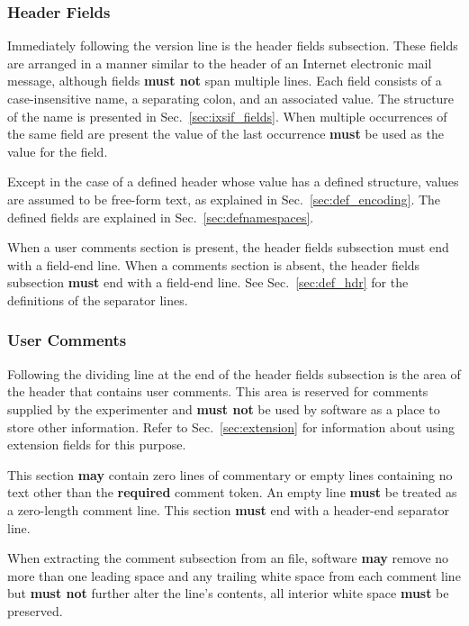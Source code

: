 \documentclass{article}
\begin{document}
\subsubsection{Header Fields}
\label{sec:def_hdr_fields}

Immediately following the version line is the header fields
subsection.  These fields are arranged in a manner similar to the
header of an Internet electronic mail message, although {\xdi} fields
\textbf{must not} span multiple lines.  Each field consists of a
case-insensitive name, a separating colon, and an associated value.
The structure of the name is presented in Sec.~\ref{sec:ixsif_fields}.
When multiple occurrences of the same field are present the value of
the last occurrence \textbf{must} be used as the value for the field.

Except in the case of a defined header whose value has a defined
structure, values are assumed to be free-form text, as explained in
Sec.~\ref{sec:def_encoding}.  The defined fields are explained in
Sec.~\ref{sec:defnamespaces}.

When a user comments section is present, the header fields subsection
must end with a field-end line.  When a comments section is absent,
the header fields subsection \textbf{must} end with a field-end line.  See
Sec.~\ref{sec:def_hdr} for the definitions of the separator lines.

\subsubsection{User Comments}
\label{sec:def_hdr_comments}

Following the dividing line at the end of the header fields subsection
is the area of the header that contains user comments.  This area is
reserved for comments supplied by the experimenter and \textbf{must
  not} be used by software as a place to store other information.
Refer to Sec.~\ref{sec:extension} for information about using
extension fields for this purpose.

This section \textbf{may} contain zero lines of commentary or empty
lines containing no text other than the \textbf{required} comment
token.  An empty line \textbf{must} be treated as a zero-length
comment line. This section \textbf{must} end with a header-end
separator line.

When extracting the comment subsection from an {\xdi} file, software
\textbf{may} remove no more than one leading space and any trailing
white space from each comment line but \textbf{must not} further alter
the line's contents, all interior white space \textbf{must} be preserved.
\end{document}
